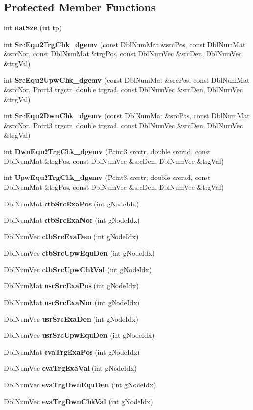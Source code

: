 \subsection*{Protected Member Functions}
\begin{CompactItemize}
\item 
int {\bf dat\-Sze} (int tp)
\item 
int {\bf Src\-Equ2Trg\-Chk\_\-dgemv} (const Dbl\-Num\-Mat \&src\-Pos, const Dbl\-Num\-Mat \&src\-Nor, const Dbl\-Num\-Mat \&trg\-Pos, const Dbl\-Num\-Vec \&src\-Den, Dbl\-Num\-Vec \&trg\-Val)
\item 
int {\bf Src\-Equ2Upw\-Chk\_\-dgemv} (const Dbl\-Num\-Mat \&src\-Pos, const Dbl\-Num\-Mat \&src\-Nor, Point3 trgctr, double trgrad, const Dbl\-Num\-Vec \&src\-Den, Dbl\-Num\-Vec \&trg\-Val)
\item 
int {\bf Src\-Equ2Dwn\-Chk\_\-dgemv} (const Dbl\-Num\-Mat \&src\-Pos, const Dbl\-Num\-Mat \&src\-Nor, Point3 trgctr, double trgrad, const Dbl\-Num\-Vec \&src\-Den, Dbl\-Num\-Vec \&trg\-Val)
\item 
int {\bf Dwn\-Equ2Trg\-Chk\_\-dgemv} (Point3 srcctr, double srcrad, const Dbl\-Num\-Mat \&trg\-Pos, const Dbl\-Num\-Vec \&src\-Den, Dbl\-Num\-Vec \&trg\-Val)
\item 
int {\bf Upw\-Equ2Trg\-Chk\_\-dgemv} (Point3 srcctr, double srcrad, const Dbl\-Num\-Mat \&trg\-Pos, const Dbl\-Num\-Vec \&src\-Den, Dbl\-Num\-Vec \&trg\-Val)
\item 
Dbl\-Num\-Mat {\bf ctb\-Src\-Exa\-Pos} (int g\-Node\-Idx)
\item 
Dbl\-Num\-Mat {\bf ctb\-Src\-Exa\-Nor} (int g\-Node\-Idx)
\item 
Dbl\-Num\-Vec {\bf ctb\-Src\-Exa\-Den} (int g\-Node\-Idx)
\item 
Dbl\-Num\-Vec {\bf ctb\-Src\-Upw\-Equ\-Den} (int g\-Node\-Idx)
\item 
Dbl\-Num\-Vec {\bf ctb\-Src\-Upw\-Chk\-Val} (int g\-Node\-Idx)
\item 
Dbl\-Num\-Mat {\bf usr\-Src\-Exa\-Pos} (int g\-Node\-Idx)
\item 
Dbl\-Num\-Mat {\bf usr\-Src\-Exa\-Nor} (int g\-Node\-Idx)
\item 
Dbl\-Num\-Vec {\bf usr\-Src\-Exa\-Den} (int g\-Node\-Idx)
\item 
Dbl\-Num\-Vec {\bf usr\-Src\-Upw\-Equ\-Den} (int g\-Node\-Idx)
\item 
Dbl\-Num\-Mat {\bf eva\-Trg\-Exa\-Pos} (int g\-Node\-Idx)
\item 
Dbl\-Num\-Vec {\bf eva\-Trg\-Exa\-Val} (int g\-Node\-Idx)
\item 
Dbl\-Num\-Vec {\bf eva\-Trg\-Dwn\-Equ\-Den} (int g\-Node\-Idx)
\item 
Dbl\-Num\-Vec {\bf eva\-Trg\-Dwn\-Chk\-Val} (int g\-Node\-Idx)
\end{CompactItemize}
